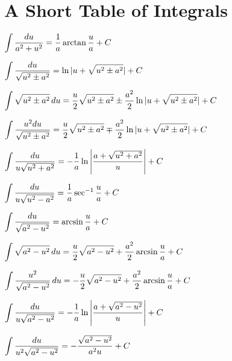 \chapter{A Short Table of Integrals} \label{C:9.IntegralTable}


\bigskip  

\be
	\item  $\displaystyle \int \frac{du}{a^2 + u^2} =  \frac{1}{a} \arctan \frac{u}{a} + C$ 
	\item $\displaystyle \int \frac{du}{\sqrt{u^2 \pm a^2}} = \ln |u + \sqrt{u^2 \pm a^2}| + C$ 
	\item $\displaystyle \int \sqrt{u^2 \pm a^2} \, du = \frac{u}{2}\sqrt{u^2 \pm a^2} \pm \frac{a^2}{2}\ln|u + \sqrt{u^2 \pm a^2}| + C $ 
	\item $\displaystyle \int \frac{u^2 du}{\sqrt{u^2 \pm a^2}} = \frac{u}{2}\sqrt{u^2 \pm a^2} \mp \frac{a^2}{2}\ln|u + \sqrt{u^2 \pm a^2}| + C  $ 
	\item $\displaystyle \int \frac{du}{u\sqrt{u^2+a^2}} = -\frac{1}{a} \ln \left| \frac{a+\sqrt{u^2 + a^2}}{u} \right| + C $ 
	\item $\displaystyle \int \frac{du}{u\sqrt{u^2-a^2}} = \frac{1}{a} \sec^{-1} \frac{u}{a} + C$ 
	\item $\displaystyle \int \frac{du}{\sqrt{a^2 - u^2}} =  \arcsin \frac{u}{a} + C$ 
	\item $\displaystyle \int \sqrt{a^2 - u^2} \, du = \frac{u}{2}\sqrt{a^2 - u^2} + \frac{a^2}{2} \arcsin \frac{u}{a} + C$ 
	\item $\displaystyle \int \frac{u^2}{\sqrt{a^2 - u^2}} \, du = -\frac{u}{2}\sqrt{a^2 - u^2} + \frac{a^2}{2} \arcsin \frac{u}{a} + C$ 
	\item $\displaystyle \int \frac{du}{u\sqrt{a^2 - u^2}}  = -\frac{1}{a} \ln \left| \frac{a + \sqrt{a^2 - u^2}}{u} \right| + C$ 
	\item $\displaystyle \int \frac{du}{u^2\sqrt{a^2 - u^2}}  = -\frac{\sqrt{a^2-u^2}}{a^2 u} + C$ 
\ee
